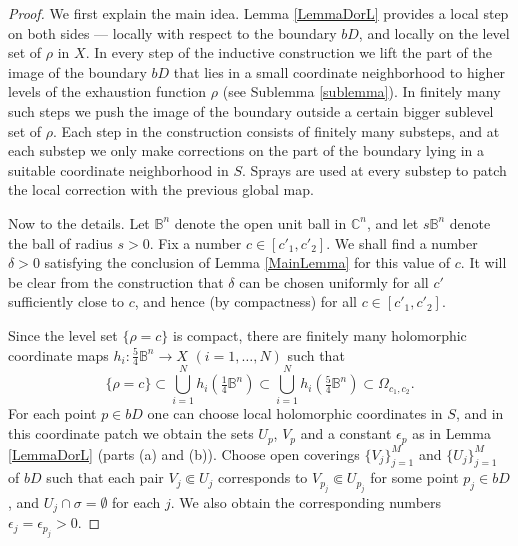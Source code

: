 \documentclass[11pt]{amsart}
\numberwithin{equation}{section}
\theoremstyle{definition}
\begin{document}
\begin{proof}
We first explain the main idea.
Lemma \ref{LemmaDorL} provides a local step on both sides --- 
locally with respect to the boundary $bD$,
and locally on the level set of $\rho$ in $X$. 
In every step of the inductive construction  we lift the part of 
the image of the boundary $bD$ that lies in a small 
coordinate neighborhood to higher levels of the exhaustion function 
$\rho$ (see Sublemma \ref{sublemma}).
In finitely many such steps we push the image 
of the boundary outside a certain bigger sublevel set of $\rho$.
Each step in the construction consists of finitely many substeps,
and at each substep we only make corrections on the part of 
the boundary lying in a suitable coordinate neighborhood in $S$. 
Sprays are used at every substep to patch the local correction 
with the previous global map. 

Now to the details. Let ${\mathbb{B}}^n$ denote the open unit ball in ${\mathbb{C}}^n$, 
and let $s{\mathbb{B}}^n$ denote the ball of radius $s >0$. 
Fix a number $c\in [c'_1,c'_2]$. We shall find a number $\delta>0$ 
satisfying the conclusion of Lemma \ref{MainLemma} for this value of $c$. 
It will be clear from the construction that $\delta$ can be 
chosen uniformly for all $c'$ sufficiently close to $c$, 
and hence (by compactness) for all $c\in[c'_1,c'_2]$.

Since the level set $\{\rho=c\}$ is compact, 
there are finitely many holomorphic coordinate maps 
$h_i\colon\tfrac54{\mathbb{B}}^n\to X$ $(i=1,\ldots,N)$ such that
\[
	\{\rho=c\}\subset \bigcup_{i=1}^{N} h_i(\tfrac14{\mathbb{B}}^n) \subset 
	\bigcup_{i=1}^{N} h_i(\tfrac54{\mathbb{B}}^n) \subset \Omega_{c_1,c_2}.
\]
For each point $p\in bD$ one can choose local holomorphic 
coordinates in $S$, and in this coordinate patch we obtain the sets 
$U_p$, $V_p$ and a constant ${\epsilon}_p$ as in Lemma \ref{LemmaDorL} (parts (a) and (b)).
Choose open coverings $\{V_j\}_{j=1}^M$ and $\{U_j\}_{j=1}^M$
of $bD$ such that each pair $V_j\Subset U_j$ 
corresponds to $V_{p_j} \Subset U_{p_j}$ for some point $p_j\in bD$,
and $U_j\cap \sigma=\emptyset$ for each $j$. We also obtain the 
corresponding numbers ${\epsilon}_j={\epsilon}_{p_j}>0$. 


\end{proof}
\end{document}
